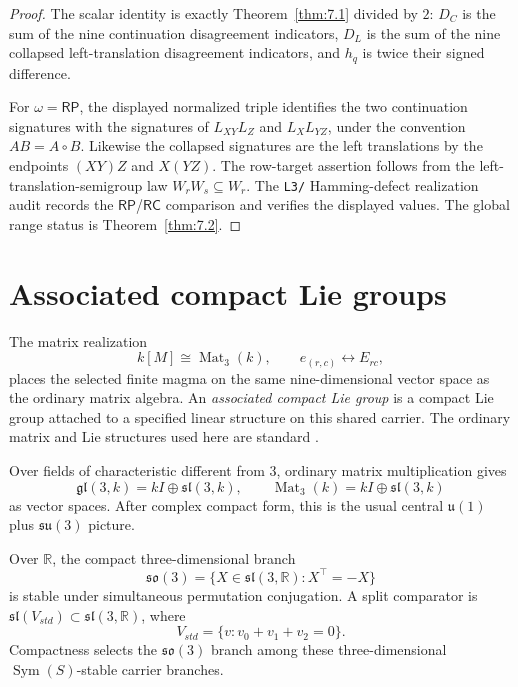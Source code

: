 \documentclass[11pt]{article}
\theoremstyle{definition}
\newcommand{\RP}{\mathsf{RP}}
\newcommand{\RC}{\mathsf{RC}}
\begin{document}
\begin{proof}
The scalar identity is exactly Theorem~\ref{thm:7.1} divided by \(2\):
\(D_C\) is the sum of the nine continuation disagreement indicators,
\(D_L\) is the sum of the nine collapsed left-translation disagreement
indicators, and \(h_q\) is twice their signed difference.

For \(\omega=\RP\), the displayed normalized triple identifies the two
continuation signatures with the signatures of \(L_{XY}L_Z\) and
\(L_XL_{YZ}\), under the convention \(AB=A\circ B\).  Likewise the collapsed
signatures are the left translations by the endpoints \((XY)Z\) and
\(X(YZ)\).  The row-target assertion follows from the left-translation-semigroup law
\(W_rW_s\subseteq W_r\).  The \texttt{L3/} Hamming-defect realization audit
records the \(\RP\)/\(\RC\) comparison and verifies the displayed values.  The
global range status is Theorem~\ref{thm:7.2}.
\end{proof}

\section{Associated compact Lie groups}\label{associated-compact-lie-groups}\label{associated-compact-lie-package}

The matrix realization
\[
k[M]\cong\operatorname{Mat}_3(k),
\qquad e_{(r,c)}\leftrightarrow E_{rc},
\]
places the selected finite magma on the same nine-dimensional vector space as the
ordinary matrix algebra.  An \emph{associated compact Lie group} is a compact
Lie group attached to a specified linear structure on this shared carrier.  The
ordinary matrix and Lie structures used here are standard
\cite{HornJohnson2012,FultonHarris1991,Hall2015}.

Over fields of characteristic different from \(3\), ordinary matrix
multiplication gives
\[
\mathfrak{gl}(3,k)=kI\oplus\mathfrak{sl}(3,k),
\qquad
\operatorname{Mat}_3(k)=kI\oplus\mathfrak{sl}(3,k)
\]
as vector spaces.  After complex compact form, this is the usual central
\(\mathfrak u(1)\) plus \(\mathfrak{su}(3)\) picture.

Over \(\mathbb R\), the compact three-dimensional branch
\[
\mathfrak{so}(3)=\{X\in\mathfrak{sl}(3,\mathbb R):X^\top=-X\}
\]
is stable under simultaneous permutation conjugation.  A split comparator is
\(\mathfrak{sl}(V_{std})\subset\mathfrak{sl}(3,\mathbb R)\), where
\[
V_{std}=\{v:v_0+v_1+v_2=0\}.
\]
Compactness selects the \(\mathfrak{so}(3)\) branch among these
three-dimensional \(\operatorname{Sym}(S)\)-stable carrier branches.
\end{document}
